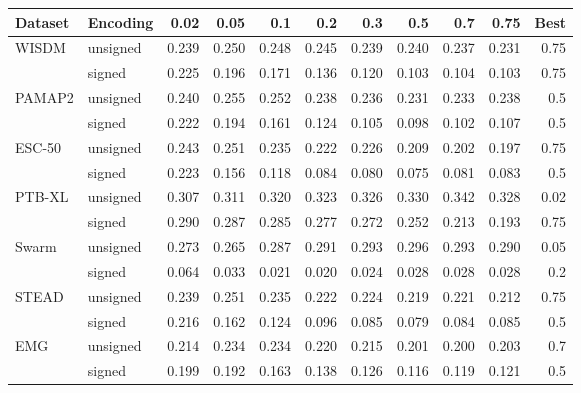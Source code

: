 \begin{tabular}{@{}llrrrrrrrrr@{}}
\toprule
Dataset & Encoding & 0.02 & 0.05 & 0.1 & 0.2 & 0.3 & 0.5 & 0.7 & 0.75 & Best \\
\midrule
WISDM & unsigned & 0.239 & 0.250 & 0.248 & 0.245 & 0.239 & 0.240 & 0.237 & 0.231 & 0.75 \\
 & signed & 0.225 & 0.196 & 0.171 & 0.136 & 0.120 & 0.103 & 0.104 & 0.103 & 0.75 \\
PAMAP2 & unsigned & 0.240 & 0.255 & 0.252 & 0.238 & 0.236 & 0.231 & 0.233 & 0.238 & 0.5 \\
 & signed & 0.222 & 0.194 & 0.161 & 0.124 & 0.105 & 0.098 & 0.102 & 0.107 & 0.5 \\
ESC-50 & unsigned & 0.243 & 0.251 & 0.235 & 0.222 & 0.226 & 0.209 & 0.202 & 0.197 & 0.75 \\
 & signed & 0.223 & 0.156 & 0.118 & 0.084 & 0.080 & 0.075 & 0.081 & 0.083 & 0.5 \\
PTB-XL & unsigned & 0.307 & 0.311 & 0.320 & 0.323 & 0.326 & 0.330 & 0.342 & 0.328 & 0.02 \\
 & signed & 0.290 & 0.287 & 0.285 & 0.277 & 0.272 & 0.252 & 0.213 & 0.193 & 0.75 \\
Swarm & unsigned & 0.273 & 0.265 & 0.287 & 0.291 & 0.293 & 0.296 & 0.293 & 0.290 & 0.05 \\
 & signed & 0.064 & 0.033 & 0.021 & 0.020 & 0.024 & 0.028 & 0.028 & 0.028 & 0.2 \\
STEAD & unsigned & 0.239 & 0.251 & 0.235 & 0.222 & 0.224 & 0.219 & 0.221 & 0.212 & 0.75 \\
 & signed & 0.216 & 0.162 & 0.124 & 0.096 & 0.085 & 0.079 & 0.084 & 0.085 & 0.5 \\
EMG & unsigned & 0.214 & 0.234 & 0.234 & 0.220 & 0.215 & 0.201 & 0.200 & 0.203 & 0.7 \\
 & signed & 0.199 & 0.192 & 0.163 & 0.138 & 0.126 & 0.116 & 0.119 & 0.121 & 0.5 \\
\bottomrule
\end{tabular}
